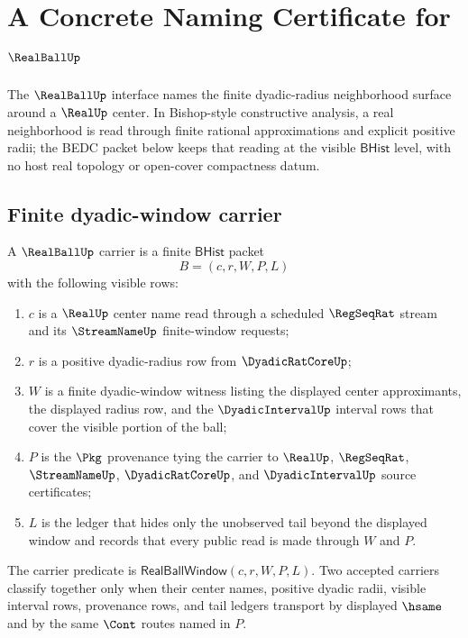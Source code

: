 \chapter{A Concrete Naming Certificate for $\RealBallUp$}
\label{ch:concrete-instances-realball-namecert}

The $\RealBallUp$ interface names the finite dyadic-radius neighborhood surface around a $\RealUp$ center. In Bishop-style constructive analysis, a real neighborhood is read through finite rational approximations and explicit positive radii; the BEDC packet below keeps that reading at the visible $\mathsf{BHist}$ level, with no host real topology or open-cover compactness datum.

\section{Finite dyadic-window carrier}
\label{sec:realball-finite-dyadic-window-carrier}

\begin{definition}
\label{def:realball-window-carrier}
A $\RealBallUp$ carrier is a finite $\mathsf{BHist}$ packet
$$
B=(c,r,W,P,L)
$$
with the following visible rows:
\begin{enumerate}
\item $c$ is a $\RealUp$ center name read through a scheduled $\RegSeqRat$ stream and its $\StreamNameUp$ finite-window requests;
\item $r$ is a positive dyadic-radius row from $\DyadicRatCoreUp$;
\item $W$ is a finite dyadic-window witness listing the displayed center approximants, the displayed radius row, and the $\DyadicIntervalUp$ interval rows that cover the visible portion of the ball;
\item $P$ is the $\Pkg$ provenance tying the carrier to $\RealUp$, $\RegSeqRat$, $\StreamNameUp$, $\DyadicRatCoreUp$, and $\DyadicIntervalUp$ source certificates;
\item $L$ is the ledger that hides only the unobserved tail beyond the displayed window and records that every public read is made through $W$ and $P$.
\end{enumerate}
The carrier predicate is $\mathsf{RealBallWindow}(c,r,W,P,L)$. Two accepted carriers classify together only when their center names, positive dyadic radii, visible interval rows, provenance rows, and tail ledgers transport by displayed $\hsame$ and by the same $\Cont$ routes named in $P$.
\end{definition}

